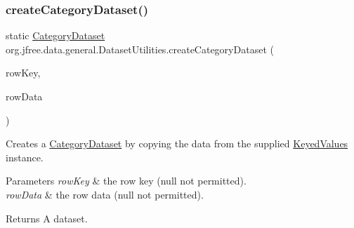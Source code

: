 \subsubsection{\texorpdfstring{create\+Category\+Dataset()}{createCategoryDataset()}\hspace{0.1cm}{\footnotesize\ttfamily [4/4]}}
{\footnotesize\ttfamily static \mbox{\hyperlink{interfaceorg_1_1jfree_1_1data_1_1category_1_1_category_dataset}{Category\+Dataset}} org.\+jfree.\+data.\+general.\+Dataset\+Utilities.\+create\+Category\+Dataset (\begin{DoxyParamCaption}\item[{Comparable}]{row\+Key,  }\item[{\mbox{\hyperlink{interfaceorg_1_1jfree_1_1data_1_1_keyed_values}{Keyed\+Values}}}]{row\+Data }\end{DoxyParamCaption})\hspace{0.3cm}{\ttfamily [static]}}

Creates a \mbox{\hyperlink{}{Category\+Dataset}} by copying the data from the supplied \mbox{\hyperlink{interfaceorg_1_1jfree_1_1data_1_1_keyed_values}{Keyed\+Values}} instance.


\begin{DoxyParams}{Parameters}
{\em row\+Key} & the row key ({\ttfamily null} not permitted). \\
\hline
{\em row\+Data} & the row data ({\ttfamily null} not permitted).\\
\hline
\end{DoxyParams}
\begin{DoxyReturn}{Returns}
A dataset. 
\end{DoxyReturn}
\mbox{\label{classorg_1_1jfree_1_1data_1_1general_1_1_dataset_utilities_a8cf7fb0b464369b6d1b3b435a4c36d50}} 
